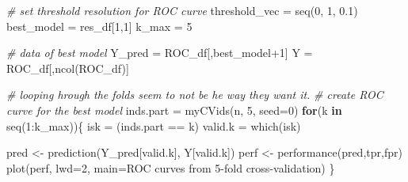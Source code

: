 \documentclass[
  11pt,
]{article}
\newenvironment{Shaded}{\begin{snugshade}}{\end{snugshade}}
\newcommand{\AttributeTok}[1]{\textcolor[rgb]{0.77,0.63,0.00}{#1}}
\newcommand{\CommentTok}[1]{\textcolor[rgb]{0.56,0.35,0.01}{\textit{#1}}}
\newcommand{\ControlFlowTok}[1]{\textcolor[rgb]{0.13,0.29,0.53}{\textbf{#1}}}
\newcommand{\DecValTok}[1]{\textcolor[rgb]{0.00,0.00,0.81}{#1}}
\newcommand{\FloatTok}[1]{\textcolor[rgb]{0.00,0.00,0.81}{#1}}
\newcommand{\FunctionTok}[1]{\textcolor[rgb]{0.00,0.00,0.00}{#1}}
\newcommand{\NormalTok}[1]{#1}
\newcommand{\OtherTok}[1]{\textcolor[rgb]{0.56,0.35,0.01}{#1}}
\newcommand{\SpecialCharTok}[1]{\textcolor[rgb]{0.00,0.00,0.00}{#1}}
\newcommand{\StringTok}[1]{\textcolor[rgb]{0.31,0.60,0.02}{#1}}
\begin{document}
\begin{Shaded}
\begin{Highlighting}[]
\CommentTok{\# set threshold resolution for ROC curve}
\NormalTok{threshold\_vec }\OtherTok{=} \FunctionTok{seq}\NormalTok{(}\DecValTok{0}\NormalTok{, }\DecValTok{1}\NormalTok{, }\FloatTok{0.1}\NormalTok{)}
\NormalTok{best\_model }\OtherTok{=}\NormalTok{ res\_df[}\DecValTok{1}\NormalTok{,}\DecValTok{1}\NormalTok{]}
\NormalTok{k\_max }\OtherTok{=} \DecValTok{5}

\CommentTok{\# data of best model}
\NormalTok{Y\_pred }\OtherTok{=}\NormalTok{ ROC\_df[,best\_model}\SpecialCharTok{+}\DecValTok{1}\NormalTok{]}
\NormalTok{Y }\OtherTok{=}\NormalTok{ ROC\_df[,}\FunctionTok{ncol}\NormalTok{(ROC\_df)]}

\CommentTok{\# looping hrough the folds seem to not be he way they want it.}
\CommentTok{\# create ROC curve for the best model}
\NormalTok{inds.part }\OtherTok{=} \FunctionTok{myCVids}\NormalTok{(n, }\DecValTok{5}\NormalTok{, }\AttributeTok{seed=}\DecValTok{0}\NormalTok{)}
\ControlFlowTok{for}\NormalTok{(k }\ControlFlowTok{in} \FunctionTok{seq}\NormalTok{(}\DecValTok{1}\SpecialCharTok{:}\NormalTok{k\_max))\{}
\NormalTok{  isk }\OtherTok{=}\NormalTok{ (inds.part }\SpecialCharTok{==}\NormalTok{ k)}
\NormalTok{  valid.k }\OtherTok{=} \FunctionTok{which}\NormalTok{(isk)}
  
\NormalTok{  pred }\OtherTok{\textless{}{-}} \FunctionTok{prediction}\NormalTok{(Y\_pred[valid.k], Y[valid.k])}
\NormalTok{  perf }\OtherTok{\textless{}{-}} \FunctionTok{performance}\NormalTok{(pred,}\StringTok{\textquotesingle{}tpr\textquotesingle{}}\NormalTok{,}\StringTok{\textquotesingle{}fpr\textquotesingle{}}\NormalTok{)}
  \FunctionTok{plot}\NormalTok{(perf,}
       \AttributeTok{lwd=}\DecValTok{2}\NormalTok{,}
       \AttributeTok{main=}\StringTok{\textquotesingle{}ROC curves from 5{-}fold cross{-}validation\textquotesingle{}}\NormalTok{)}
\NormalTok{\}}
\end{Highlighting}
\end{Shaded}
\end{document}
